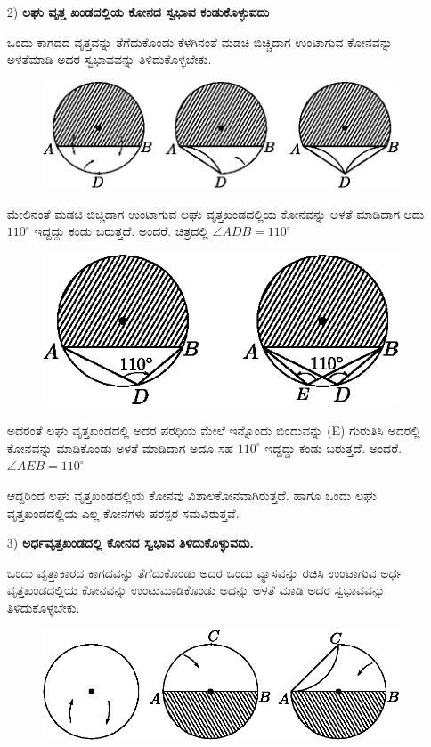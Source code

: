 \begin{itemize}
 \item[2)] \textbf{ಲಘು ವೃತ್ತ ಖಂಡದಲ್ಲಿಯ ಕೋನದ ಸ್ವಭಾವ ಕಂಡುಕೊಳ್ಳುವದು} 
 
 ಒಂದು ಕಾಗದದ ವೃತ್ತವನ್ನು ತೆಗೆದುಕೊಂಡು ಕೆಳಗಿನಂತೆ ಮಡಚಿ ಬಿಚ್ಚಿದಾಗ ಉಂಟಾಗುವ ಕೋನವನ್ನು ಅಳತೆಮಾಡಿ ಅದರ ಸ್ವಭಾವವನ್ನು ತಿಳಿದುಕೊಳ್ಳಬೇಕು. 
 \begin{figure}[H]
\centering
\includegraphics[scale=.98]{src/figure/chap1/fig1-30a.eps}
\end{figure}
 
 ಮೇಲಿನಂತೆ ಮಡಚಿ ಬಿಚ್ಚಿದಾಗ ಉಂಟಾಗುವ ಲಘು ವೃತ್ತಖಂಡದಲ್ಲಿಯ ಕೋನವನ್ನು ಅಳತೆ ಮಾಡಿದಾಗ ಅದು $110^\circ$ ಇದ್ದದ್ದು ಕಂಡು ಬರುತ್ತದೆ. ಅಂದರೆ. ಚಿತ್ರದಲ್ಲಿ  $\angle ADB = 110^\circ$
  \begin{figure}[H]
\centering
\includegraphics[scale=.98]{src/figure/chap1/fig1-30b.eps}
\end{figure}
 
 ಅದರಂತೆ ಲಘು ವೃತ್ತಖಂಡದಲ್ಲಿ ಅದರ ಪರಧಿಯ ಮೇಲೆ ಇನ್ನೊಂದು ಬಿಂದುವನ್ನು (E) ಗುರುತಿಸಿ ಅದರಲ್ಲಿ ಕೋನವನ್ನು ಮಾಡಿಕೊಂಡು ಅಳತೆ ಮಾಡಿದಾಗ ಅದೂ ಸಹ  $110^\circ$ ಇದ್ದದ್ದು ಕಂಡು ಬರುತ್ತದೆ. ಅಂದರೆ.  $\angle AEB = 110^\circ$
 
 ಆದ್ದರಿಂದ ಲಘು ವೃತ್ತಖಂಡದಲ್ಲಿಯ ಕೋನವು ವಿಶಾಲಕೋನವಾಗಿರುತ್ತದೆ. ಹಾಗೂ ಒಂದು ಲಘು ವೃತ್ತಖಂಡದಲ್ಲಿಯ ಎಲ್ಲ ಕೋನಗಳು ಪರಸ್ಪರ ಸಮವಿರುತ್ತವೆ.  
 
  \item[3)] \textbf{ಅರ್ಧವೃತ್ತಖಂಡದಲ್ಲಿ ಕೋನದ ಸ್ವಭಾವ ತಿಳಿದುಕೊಳ್ಳುವದು.}
  
  ಒಂದು ವೃತ್ತಾಕಾರದ ಕಾಗದವನ್ನು  ತೆಗೆದುಕೊಂಡು ಅದರ ಒಂದು ವ್ಯಾಸವನ್ನು ರಚಿಸಿ ಉಂಟಾಗುವ ಅರ್ಧ ವೃತ್ತಖಂಡದಲ್ಲಿಯ ಕೋನವನ್ನು ಉಂಟುಮಾಡಿ\break ಕೊಂಡು ಅದನ್ನು ಅಳತೆ ಮಾಡಿ ಅದರ ಸ್ವಭಾವವನ್ನು ತಿಳಿದುಕೊಳ್ಳಬೇಕು. 
\begin{figure}[H]
\centering
\includegraphics[scale=.98]{src/figure/chap1/fig1-31a.eps}
\end{figure}
 

\end{itemize}
